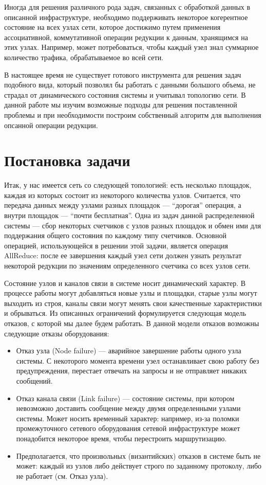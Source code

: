 \documentclass{article}
\theoremstyle{plain}
\theoremstyle{plain}
\theoremstyle{plain}
\theoremstyle{plain}
\theoremstyle{definition}
\theoremstyle{remark}
\theoremstyle{plain}
\begin{document}
Иногда для решения различного рода задач, связанных с обработкой данных в описанной инфраструктуре, необходимо поддерживать некоторое когерентное состояние на всех узлах сети, которое достижимо путем применения ассоциативной, коммутативной операции редукции к данным, хранящимся на этих узлах. Например, может потребоваться, чтобы каждый узел знал суммарное количество трафика, обрабатываемое во всей сети.

В настоящее время не существует готового инструмента для решения задач подобного вида, который позволял бы работать с данными большого объема, не страдал от динамического состояния системы и учитывал топологию сети. В данной работе мы изучим возможные подходы для решения поставленной проблемы и при необходимости построим собственный алгоритм для выполнения опсанной операции редукции.

\section{Постановка задачи}

Итак, у нас имеется сеть со следующей топологией: есть несколько площадок, каждая из которых состоит из некоторого количества узлов. Считается, что передача данных между узлами разных площадок — \enquote{дорогая} операция, а внутри площадок — \enquote{почти бесплатная}. Одна из задач данной распределенной системы — сбор некоторых счетчиков с узлов разных площадок и обмен ими для поддержания общего состояния по каждому типу счетчиков. Основной операцией, использующейся в решении этой задачи, является операция AllReduce: после ее завершения каждый узел сети должен узнать результат некоторой редукции по значениям определенного счетчика со всех узлов сети.

Состояние узлов и каналов связи в системе носит динамический характер. В процессе работы могут добавляться новые узлы и площадки, старые узлы могут выходить из строя, каналы связи могут менять свои качественные характеристики и обрываться. Из описанных ограничений формулируется следующая модель отказов, с которой мы далее будем работать. В данной модели отказов возможны следующие отказы оборудования:

\begin{itemize}
    \item Отказ узла (Node failure) — аварийное завершение работы одного узла системы. С некоторого момента времени узел останавливает свою работу без предупреждения, перестает отвечать на запросы и не отправляет никаких сообщений.
    
    \item Отказ канала связи (Link failure) — состояние системы, при котором невозможно доставить сообщение между двумя определенными узлами системы. Может носить временный характер: например, из-за поломки промежуточного сетевого оборудования сетевой инфраструктуре может понадобится некоторое время, чтобы перестроить маршрутизацию.
    
    \item Предполагается, что произвольных (византийских) отказов в системе быть не может: каждый из узлов либо действует строго по заданному протоколу, либо не работает (см. Отказ узла).
\end{itemize}
\end{document}
